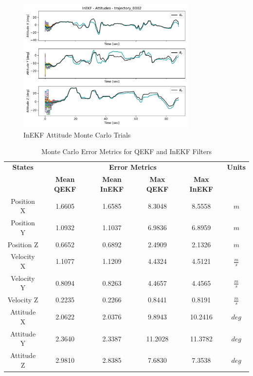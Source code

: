 \begin{figure}[H]
    \centering
    \includegraphics[width=0.8\textwidth]{figs/InEKF_trajectory_0002_attitudes.pdf}
    \caption{InEKF Attitude Monte Carlo Trials}
    \label{fig: InEKF Attitude Monte Carlo Trials}
\end{figure}

\begin{table}[H]
\centering
\begin{tabular}{|c|c|c|c|c|c|}
    \hline
    \textbf{States} & \multicolumn{4}{|c|}{\textbf{Error Metrics}} & \textbf{Units} \\
    \cline{2-5}
    & \textbf{Mean QEKF} & \textbf{Mean InEKF} & \textbf{Max QEKF} & \textbf{Max InEKF} & \\
    \hline
    Position X & 1.6605 & 1.6585 & 8.3048 & 8.5558 & $m$ \\
    Position Y & 1.0932 & 1.1037 & 6.9836 & 6.8959 & $m$ \\
    Position Z & 0.6652 & 0.6892 & 2.4909 & 2.1326 & $m$ \\
    \hline
    Velocity X & 1.1077 & 1.1209 & 4.4324 & 4.5121 & $\frac{m}{s}$ \\
    Velocity Y & 0.8094 & 0.8263 & 4.4657 & 4.4565 & $\frac{m}{s}$ \\
    Velocity Z & 0.2235 & 0.2266 & 0.8441 & 0.8191 & $\frac{m}{s}$ \\
    \hline
    Attitude X & 2.0622 & 2.0376 & 9.8943 & 10.2416 & $deg$ \\
    Attitude Y & 2.3640 & 2.3387 & 11.2028 & 11.3782 & $deg$ \\
    Attitude Z & 2.9810 & 2.8385 & 7.6830 & 7.3538 & $deg$ \\
    \hline
\end{tabular}
\caption{Monte Carlo Error Metrics for QEKF and InEKF Filters}
\label{tab: error metrics}
\end{table}

